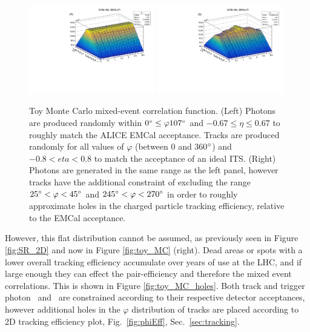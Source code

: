 \begin{figure}[htpb]
	\includegraphics[width=0.49\textwidth]{Data_Analysis/EventMixing/toy_MC_no_holes.pdf}
	\includegraphics[width=0.49\textwidth]{Data_Analysis/EventMixing/toy_MC_holes.pdf}
  \caption{Toy Monte Carlo mixed-event correlation function. (Left) Photons are produced randomly within $0\degree \leq \varphi 107\degree$ and $ -0.67 \leq \eta \leq 0.67$ to roughly match the ALICE EMCal acceptance. Tracks are produced randomly for all values of $\varphi$ (between 0 and 360$\degree$) and $-0.8 < eta < 0.8$ to match the acceptance of an ideal ITS. (Right) Photons are generated in the same range as the left panel, however tracks have the additional constraint of excluding the range $ 25\degree< \varphi < 45\degree$ and $ 245\degree < \varphi < 270\degree$ in order to roughly approximate holes in the charged particle tracking efficiency, relative to the EMCal acceptance.} 
	\label{fig:toy}
\end{figure}

However, this flat distribution cannot be assumed, as previously seen in Figure \ref{fig:SR_2D} and now in Figure \ref{fig:toy_MC} (right). Dead areas or spots with a lower overall tracking efficiency accumulate over years of use at the LHC, and if large enough they can effect the pair-efficiency and therefore the mixed event correlations. This is shown in Figure \ref{fig:toy_MC_holes}. Both track and trigger photon \deltaeta~and \deltaphi~are constrained according to their respective detector acceptances, however additional holes in the $\varphi$ distribution of tracks are placed according to 2D tracking efficiency plot, Fig.~\ref{fig:phiEff}, Sec.~\ref{sec:tracking}.

